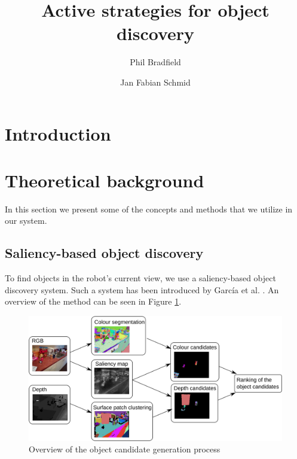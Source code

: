 \documentclass[a4paper,11pt,english]{article}
\begin{document}
\title{Active strategies for object discovery}
\author{Phil Bradfield \and Jan Fabian Schmid}

\maketitle 

\section{Introduction}
\label{Introduction}



\section{Theoretical background}
\label{Theoretical_background}

In this section we present some of the concepts and methods that we utilize in our system.

\subsection{Saliency-based object discovery}
\label{Theoretical_background:Saliency-based_object_discovery}
To find objects in the robot's current view, we use a saliency-based object discovery system.
Such a system has been introduced by García et al. \cite{garcia2015saliency}.
An overview of the method can be seen in Figure \ref{fig:2Dobject_discovery}.

\begin{figure}[h!]
	\begin{center}
		\includegraphics[width=1\textwidth]{src/saliency_object_detection.png}
		\caption{ Overview of the object candidate generation process \cite{garcia2015saliency}}
		\label{fig:2Dobject_discovery}
	\end{center}
\end{figure}
\end{document}
